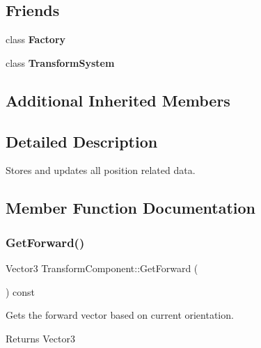 \subsection*{Friends}
\begin{DoxyCompactItemize}
\item 
\mbox{\label{classTransformComponent_a328c093d609680cca505905c6d49901a}} 
class {\bfseries Factory}
\item 
\mbox{\label{classTransformComponent_a318469cfd809ba3993eb0331cba48707}} 
class {\bfseries Transform\+System}
\end{DoxyCompactItemize}
\subsection*{Additional Inherited Members}


\subsection{Detailed Description}
Stores and updates all position related data. 

\subsection{Member Function Documentation}
\mbox{\label{classTransformComponent_a71e0adb8dd3a35fdca3b50817bb807a4}} 
\subsubsection{\texorpdfstring{Get\+Forward()}{GetForward()}}
{\footnotesize\ttfamily Vector3 Transform\+Component\+::\+Get\+Forward (\begin{DoxyParamCaption}{ }\end{DoxyParamCaption}) const}



Gets the forward vector based on current orientation. 

\begin{DoxyReturn}{Returns}
Vector3 
\end{DoxyReturn}
\mbox{\label{classTransformComponent_a558145da72066c99bec2a4a8ec3e2fa1}} 
